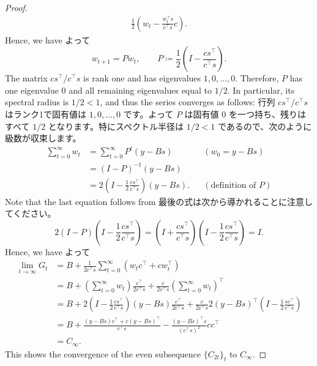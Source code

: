 \documentclass[0_main]{subfiles}
\begin{document}
\begin{proof}
\begin{align*}
        \frac{1}{2}\left(w_t-\frac{w_t^\top s}{c^\top s}c\right).
    \end{align*}
    \ifEn
        Hence, we have
    \else
        よって
    \fi
    \begin{equation*}
        w_{t+1}=Pw_t,
        \qquad
        P \coloneqq \frac{1}{2}\left(I-\frac{cs^\top}{c^\top s}\right).
    \end{equation*}
    \ifEn
        The matrix $cs^\top/c^\top s$ is rank one and has eigenvalues $1,0,\dots,0$. Therefore, $P$ has one eigenvalue $0$ and all remaining eigenvalues equal to $1/2$. In particular, its spectral radius is $1/2<1$, and thus the series converges as follows:
    \else
        行列 $cs^\top/c^\top s$ はランク1で固有値は $1,0,\dots,0$ です。よって $P$ は固有値 $0$ を一つ持ち、残りはすべて $1/2$ となります。特にスペクトル半径は $1/2<1$ であるので、次のように級数が収束します。
    \fi
    \begin{align*}
        \sum_{t=0}^{\infty}w_t & =        \sum_{t=0}^{\infty}P^t(y-Bs)                         &  & (w_0=y-Bs)                \\
                               & =  (I-P)^{-1}(y-Bs)                                                                          \\
                               & = 2\left(I-\frac{1}{2}\frac{cs^\top}{c^\top s}\right) (y-Bs). &  & (\text{definition of } P)
    \end{align*}
    \ifEn
        Note that the last equation follows from
    \else
        最後の式は次から導かれることに注意してください。
    \fi
    \begin{equation*}
        2(I-P) \left(I-\frac{1}{2}\frac{cs^\top}{c^\top s}\right) = \left(I + \frac{cs^\top}{c^\top s}\right) \left(I-\frac{1}{2}\frac{cs^\top}{c^\top s}\right) = I.
    \end{equation*}
    \ifEn
        Hence, we have
    \else
        よって
    \fi
    \begin{align*}
        \lim_{t\to\infty}G_t
         & =
        B+\frac{1}{2c^\top s}
        \sum_{t=0}^{\infty}(w_t c^\top+c w_t^\top)                                                                                                                                        \\
         & = B+ \left(\sum_{t=0}^{\infty}w_t\right) \frac{c^\top}{2c^\top s} + \frac{c}{2c^\top s} \left(\sum_{t=0}^{\infty}w_t\right)^\top                                               \\
         & = B+ 2\left(I-\frac{1}{2}\frac{cs^\top}{c^\top s}\right) (y-Bs) \frac{c^\top}{2c^\top s} + \frac{c}{2c^\top s} 2(y-Bs)^\top \left(I-\frac{1}{2}\frac{sc^\top}{c^\top s}\right) \\
         & = B + \frac{(y - Bs)c^\top + c(y - Bs)^\top}{c^\top s} - \frac{(y - Bs)^\top s}{(c^\top s)^2} c c^\top                                                                         \\
         & = C_{\infty}.
    \end{align*}
    \ifEn
        This shows the convergence of the even subsequence $\{ C_{2t} \}_t$ to $C_{\infty}$.


\end{proof}
\end{document}
